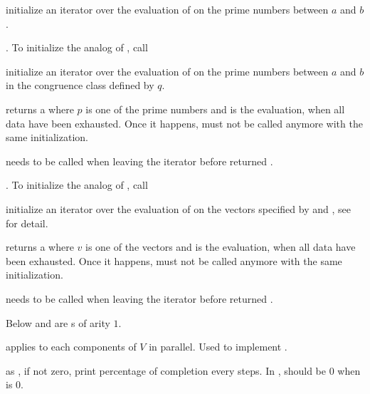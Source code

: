 initialize an iterator over the evaluation of  on the prime numbers
between $a$ and $b$.

\item {}. To initialize the analog of
, call

initialize an iterator over the evaluation of  on the prime numbers
between $a$ and $b$ in the congruence class defined by $q$.

 returns a 
\kbd{[p,code(p)]} where $p$ is one of the prime numbers and  is
the evaluation,  when all data have been exhausted. Once it happens,
must not be called anymore with the same initialization.

 needs to be called when leaving
the iterator before  returned .

\item {}. To initialize the analog of
, call

initialize an iterator over the evaluation of  on the vectors
specified by  and , see  for detail.

 returns a  \kbd{[v,code(v)]}
where $v$ is one of the vectors and  is the evaluation, 
when all data have been exhausted.  Once it happens, 
must not be called anymore with the same initialization.

 needs to be called when leaving the
iterator before  returned .


Below  and  are s of arity $1$.

 applies  to each components of $V$ in parallel. Used to implement
.

 as
, if  not zero, print percentage of completion
every  steps.  In ,  should be $0$ when
 is $0$.

